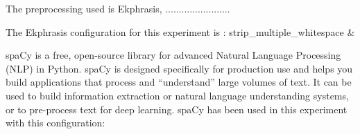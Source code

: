 \documentclass[12pt, a4paper]{article}
\begin{document}




The preprocessing used is Ekphrasis, ........................

\hfill\break
The Ekphrasis configuration for this experiment is :
    strip\_multiple\_whitespace  & \\ \hline






spaCy is a free, open-source library for advanced Natural Language Processing (NLP) in Python.
spaCy is designed specifically for production use and helps you build applications that process and “understand”
large volumes of text. It can be used to build information extraction or natural language understanding systems,
or to pre-process text for deep learning.
spaCy has been used in this experiment with this configuration:
\end{document}
